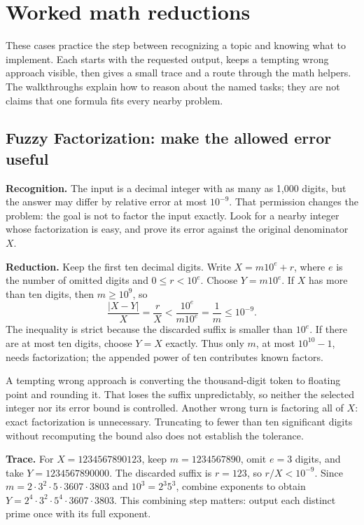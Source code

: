 \section{Worked math reductions}

These cases practice the step between recognizing a topic and knowing what to implement. Each starts with the requested output, keeps a tempting wrong approach visible, then gives a small trace and a route through the math helpers. The walkthroughs explain how to reason about the named tasks; they are not claims that one formula fits every nearby problem.

\subsection{Fuzzy Factorization: make the allowed error useful}\label{case:fuzzy}

\textbf{Recognition.} The input is a decimal integer with as many as 1,000 digits, but the answer may differ by relative error at most $10^{-9}$. That permission changes the problem: the goal is not to factor the input exactly. Look for a nearby integer whose factorization is easy, and prove its error against the original denominator $X$.

\textbf{Reduction.} Keep the first ten decimal digits. Write $X=m10^e+r$, where $e$ is the number of omitted digits and $0\le r<10^e$. Choose $Y=m10^e$. If $X$ has more than ten digits, then $m\ge10^9$, so
\[
 \frac{|X-Y|}{X}=\frac rX<\frac{10^e}{m10^e}=\frac1m\le10^{-9}.
\]
The inequality is strict because the discarded suffix is smaller than $10^e$. If there are at most ten digits, choose $Y=X$ exactly. Thus only $m$, at most $10^{10}-1$, needs factorization; the appended power of ten contributes known factors.

A tempting wrong approach is converting the thousand-digit token to floating point and rounding it. That loses the suffix unpredictably, so neither the selected integer nor its error bound is controlled. Another wrong turn is factoring all of $X$: exact factorization is unnecessary. Truncating to fewer than ten significant digits without recomputing the bound also does not establish the tolerance.

\textbf{Trace.} For $X=1234567890123$, keep $m=1234567890$, omit $e=3$ digits, and take $Y=1234567890000$. The discarded suffix is $r=123$, so $r/X<10^{-9}$. Since $m=2\cdot3^2\cdot5\cdot3607\cdot3803$ and $10^3=2^3 5^3$, combine exponents to obtain $Y=2^4\cdot3^2\cdot5^4\cdot3607\cdot3803$. This combining step matters: output each distinct prime once with its full exponent.

